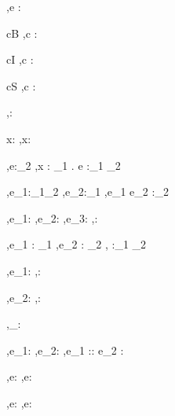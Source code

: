 



  {\Gamma,\Sigma \infers e : \tau}


  {c\in B}
  {\Gamma,\Sigma\infers c : \Bool}
  {}

  {c\in I}
  {\Gamma,\Sigma\infers c : \Int}
  {}

  {c\in S}
  {\Gamma,\Sigma\infers c : \String}
  {}


  { }
  {\Gamma,\Sigma\infers \unit : \Unit}
  {}


  {x:\tau\in\Gamma}
  {\Gamma,\Sigma\infers x:\tau}
  {}


  {\Gamma[x:\tau_1] ,\Sigma \infers e:\tau_2}
  {\Gamma,\Sigma \infers \lambda x : \tau_1 . e :\tau_1 \to \tau_2}
  {}

  { {\Gamma,\Sigma \infers e_1:\tau_1\to\tau_2 } \Quad
    {\Gamma,\Sigma \infers e_2:\tau_1}}
  {\Gamma,\Sigma \infers e_1 e_2 :\tau_2}
  {}


  { {\Gamma,\Sigma \infers e_1:\Bool}\Quad
   { {\Gamma,\Sigma \infers e_2:\tau}\Quad
   {\Gamma,\Sigma \infers e_3:\tau}}}
  {\Gamma,\Sigma \infers {}:\tau}
  {}


  {\Gamma,\Sigma \infers e_1 : \tau_1  \Quad
   \Gamma,\Sigma \infers e_2 : \tau_2}
  {\Gamma,\Sigma \infers {} :\tau_1 \times \tau_2}
  {}

  {\Gamma,\Sigma\infers e_1:\tau}
  {\Gamma,\Sigma\infers \Fst {}:\tau}
  {}

  {\Gamma,\Sigma\infers e_2:\tau}
  {\Gamma,\Sigma\infers \Snd {}:\tau}
  {}

  { }
  {\Gamma,\Sigma\infers [\ ]_\beta : \List\beta}
  {}

  { {\Gamma,\Sigma\infers e_1:\beta}\Quad
   {\Gamma,\Sigma\infers e_2:\List\beta}}
  {\Gamma,\Sigma\infers e_1 :: e_2 : \List \beta}
  {}

  {\Gamma,\Sigma\infers e:\List\beta}
  {\Gamma,\Sigma\infers \Head e:\beta}
  {}

  {\Gamma,\Sigma\infers e:\List\beta}
  {\Gamma,\Sigma\infers \Tail e:\List\beta}
  {}



